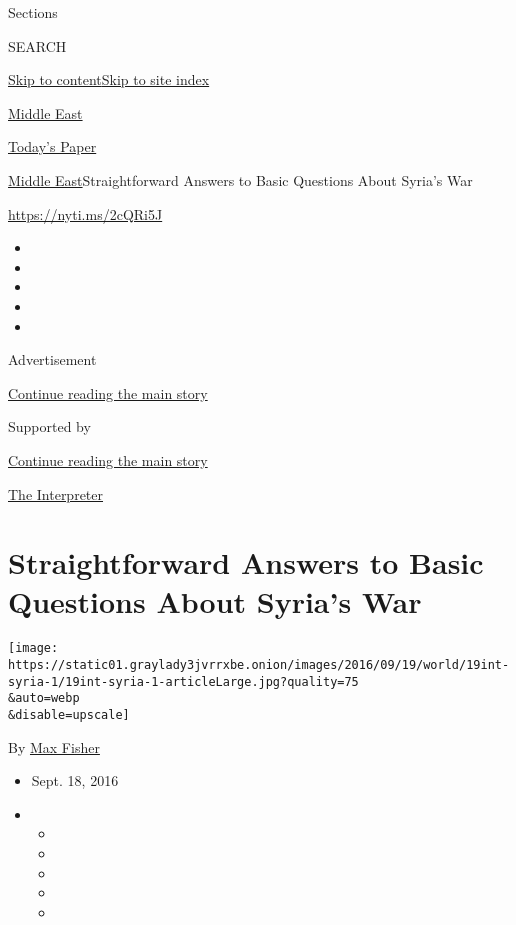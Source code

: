 Sections

SEARCH

\protect\hyperlink{site-content}{Skip to
content}\protect\hyperlink{site-index}{Skip to site index}

\href{https://www.nytimes3xbfgragh.onion/section/world/middleeast}{Middle
East}

\href{https://myaccount.nytimes3xbfgragh.onion/auth/login?response_type=cookie\&client_id=vi}{}

\href{https://www.nytimes3xbfgragh.onion/section/todayspaper}{Today's
Paper}

\href{/section/world/middleeast}{Middle East}\textbar{}Straightforward
Answers to Basic Questions About Syria's War

\url{https://nyti.ms/2cQRi5J}

\begin{itemize}
\item
\item
\item
\item
\item
\end{itemize}

Advertisement

\protect\hyperlink{after-top}{Continue reading the main story}

Supported by

\protect\hyperlink{after-sponsor}{Continue reading the main story}

\href{/column/the-interpreter}{The Interpreter}

\hypertarget{straightforward-answers-to-basic-questions-about-syrias-war}{%
\section{Straightforward Answers to Basic Questions About Syria's
War}\label{straightforward-answers-to-basic-questions-about-syrias-war}}

\texttt{[image: https://static01.graylady3jvrrxbe.onion/images/2016/09/19/world/19int-syria-1/19int-syria-1-articleLarge.jpg?quality=75\\\&auto=webp\\\&disable=upscale]}

By \href{https://www.nytimes3xbfgragh.onion/by/max-fisher}{Max Fisher}

\begin{itemize}
\item
  Sept. 18, 2016
\item
  \begin{itemize}
  \item
  \item
  \item
  \item
  \item
  \end{itemize}
\end{itemize}

